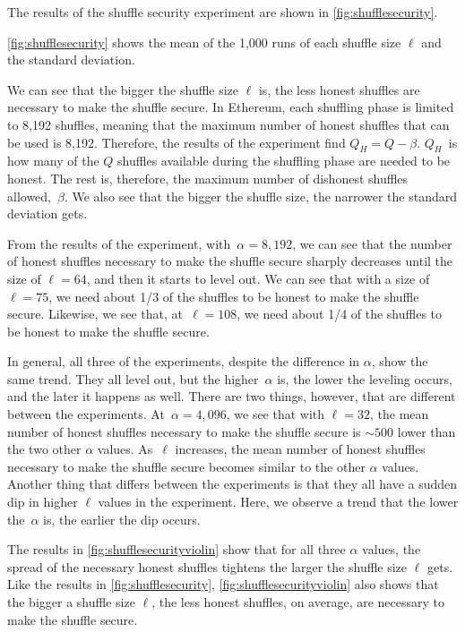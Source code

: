 The results of the shuffle security experiment are shown in \autoref{fig:shufflesecurity}.

\autoref{fig:shufflesecurity} shows the mean of the 1,000 runs of each shuffle size $\ell$ and the standard deviation.

We can see that the bigger the shuffle size $\ell$ is, the less honest shuffles are necessary to make the shuffle secure.
In Ethereum, each shuffling phase is limited to 8,192 shuffles, meaning that the maximum number of honest shuffles that can be used is 8,192.
Therefore, the results of the experiment find $Q_H=Q-\beta$.
$Q_H$~is how many of the $Q$ shuffles available during the shuffling phase are needed to be honest.
The rest is, therefore, the maximum number of dishonest shuffles allowed,~$\beta$.
We also see that the bigger the shuffle size, the narrower the standard deviation gets.

From the results of the experiment, with~$\alpha=8,192$, we can see that the number of honest shuffles necessary to make the shuffle secure sharply decreases until the size of $\ell=64$, and then it starts to level out.
We can see that with a size of $\ell=75$, we need about 1/3 of the shuffles to be honest to make the shuffle secure.
Likewise, we see that, at~$\ell=108$, we need about 1/4 of the shuffles to be honest to make the shuffle secure.

In general, all three of the experiments, despite the difference in $\alpha$, show the same trend.
They all level out, but the higher~$\alpha$ is, the lower the leveling occurs, and the later it happens as well.
There are two things, however, that are different between the experiments.
At~$\alpha=4,096$, we see that with $\ell=32$, the mean number of honest shuffles necessary to make the shuffle secure is $\sim500$ lower than the two other $\alpha$ values.
As~$\ell$ increases, the mean number of honest shuffles necessary to make the shuffle secure becomes similar to the other $\alpha$ values.
Another thing that differs between the experiments is that they all have a sudden dip in higher $\ell$ values in the experiment.
Here, we observe a trend that the lower the~$\alpha$ is, the earlier the dip occurs.



The results in \autoref{fig:shufflesecurityviolin} show that for all three $\alpha$ values, the spread of the necessary honest shuffles tightens the larger the shuffle size $\ell$ gets.
Like the results in \autoref{fig:shufflesecurity}, \autoref{fig:shufflesecurityviolin} also shows that the bigger a shuffle size $\ell$, the less honest shuffles, on average, are necessary to make the shuffle secure.

